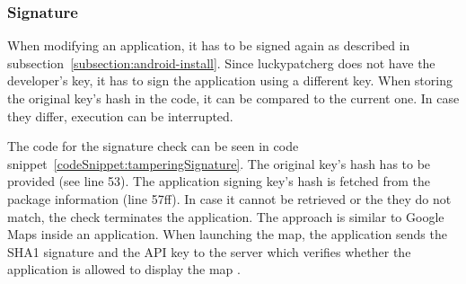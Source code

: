 \subsubsection{Signature} \label{subsection:counter-improve-tampering-signature}
When modifying an application, it has to be signed again as described in subsection~\ref{subsection:android-install}.
Since \gls{luckypatcherg} does not have the developer’s key, it has to sign the application using a different key.
\newline
When storing the original key’s hash in the code, it can be compared to the current one.
In case they differ, execution can be interrupted.
\newline

The code for the signature check can be seen in code snippet~\ref{codeSnippet:tamperingSignature}.
The original key’s hash has to be provided (see line 53).
The application signing key’s hash is fetched from the package information (line 57ff).
In case it cannot be retrieved or the they do not match, the check terminates the application.
\newline
The approach is similar to Google Maps inside an application.
When launching the map, the application sends the SHA1 signature and the API key to the server which verifies whether the application is allowed to display the map \cite{maps}.

